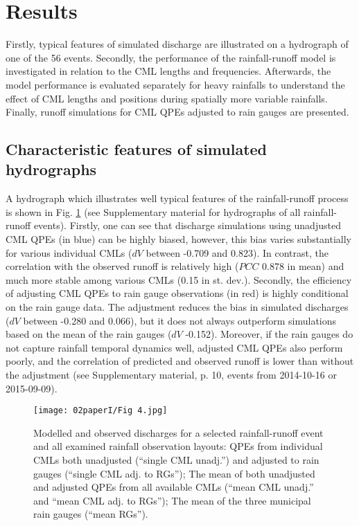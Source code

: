 \documentclass{ctuthesis}\usepackage[]{graphicx}\usepackage[]{color}
\begin{document}
\section{Results}

Firstly, typical features of simulated discharge are illustrated on a hydrograph of one of the 56 events. Secondly, the performance of the rainfall-runoff model is investigated in relation to the CML lengths and frequencies. Afterwards, the model performance is evaluated separately for heavy rainfalls to understand the effect of CML lengths and positions during spatially more variable rainfalls. Finally, runoff simulations for CML QPEs adjusted to rain gauges are presented.

\subsection{Characteristic features of simulated hydrographs}

A hydrograph which illustrates well typical features of the rainfall-runoff process is shown in Fig. \ref{2fig4} (see Supplementary material for hydrographs of all rainfall-runoff events). Firstly, one can see that discharge simulations using unadjusted CML QPEs (in blue) can be highly biased, however, this bias varies substantially for various individual CMLs ($dV$ between -0.709 and 0.823). In contrast, the correlation with the observed runoff is relatively high ($PCC$ 0.878 in mean) and much more stable among various CMLs (0.15 in st. dev.). Secondly, the efficiency of adjusting CML QPEs to rain gauge observations (in red) is highly conditional on the rain gauge data. The adjustment reduces the bias in simulated discharges ($dV$ between -0.280 and 0.066), but it does not always outperform simulations based on the mean of the rain gauges ($dV$ -0.152). Moreover, if the rain gauges do not capture rainfall temporal dynamics well, adjusted CML QPEs also perform poorly, and the correlation of predicted and observed runoff is lower than without the adjustment (see Supplementary material, p. 10, events from 2014-10-16 or 2015-09-09).

\begin{figure}[H]
\begin{center}
\texttt{[image: 02paperI/Fig 4.jpg]}
\caption{Modelled and observed discharges for a selected rainfall-runoff event and all examined rainfall observation layouts: QPEs from individual CMLs both unadjusted (“single CML unadj.”) and adjusted to rain gauges (“single CML adj. to RGs”); The mean of both unadjusted and adjusted QPEs from all available CMLs (“mean CML unadj.” and “mean CML adj. to RGs”); The mean of the three municipal rain gauges (“mean RGs”).} \label{2fig4}
\end{center}
\end{figure}
\end{document}
